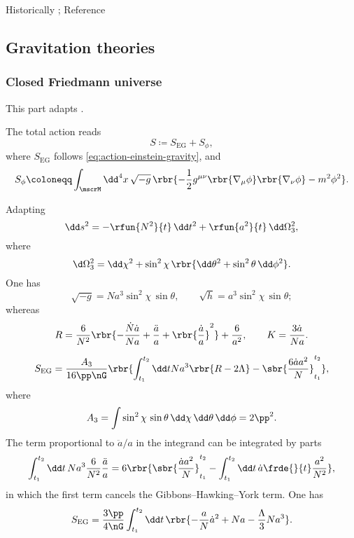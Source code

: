 \documentclass[a4paper,11pt]{article}
\begin{document}
Historically \cite{Brink1976,Deser1976,Polyakov1981};
Reference
\cite[sec.\ 3.2]{Kiefer2012}







\subsection{Gravitation theories}

\subsubsection*{Closed Friedmann universe}
This part adapts \cite[sec.\ 8.1.2]{Kiefer2012}.

The total action reads
\begin{equation}
S \coloneqq S_\text{EG} + S_\phi,
\end{equation}
where $S_\text{EG}$ follows \eqref{eq:action-einstein-gravity}, and
\begin{equation}
S_\phi \coloneqq \int_\mscrM\dd^4 x\, \sqrt{-g}\,
\rbr{-\frac{1}{2} g^{\mu\nu} \rbr{\nabla_\mu\phi} \rbr{\nabla_\nu\phi}
-m^2\phi^2}.
\end{equation}

Adapting
\begin{equation}
\dd s^2 = -\rfun{N^2}{t}\,\dd t^2 + \rfun{a^2}{t}\,\dd\Omega_3^2,
\end{equation}
where
\begin{equation}
\d\Omega_3^2 = \dd\chi^2+\sin^2\chi\,\rbr{\dd\theta^2+\sin^2\theta\,\dd\phi^2}.
\end{equation}
One has
\begin{equation}
\sqrt{-g} = N a^3 \sin^2\chi\,\sin\theta,\qquad
\sqrt{h} = a^3\sin^2\chi\,\sin\theta;
\end{equation}
whereas
\begin{equation}
R = \frac{6}{N^2}\rbr{-\frac{\dot{N}\dot{a}}{Na} + \frac{\ddot{a}}{a} + 
\rbr{\frac{\dot{a}}{a}}^2} + \frac{6}{a^2},\qquad
K = \frac{3\dot{a}}{Na}.
\end{equation}

\begin{equation}
S_\text{EG} = \frac{A_3}{16\pp\nG} \rbr{\int_{t_1}^{t_2} \dd t
Na^3\rbr{R - 2\Lambda} - \sbr{\frac{6\dot{a}a^2}{N}}_{t_1}^{t_2}},
\end{equation}
where
\begin{equation}
A_3 = \int \sin^2\chi\,\sin\theta\,\dd\chi\,\dd\theta\,\dd\phi = 2\pp^2.
\end{equation}
The term proportional to $\ddot{a}/a$ in the integrand can be integrated by
parts
\begin{equation}
\int_{t_1}^{t_2} \dd t\,Na^3 \frac{6}{N^2} \frac{\ddot{a}}{a}
= 6\rbr{\sbr{\frac{\dot{a}a^2}{N}}_{t_1}^{t_2} - \int_{t_1}^{t_2}\dd t
\,\dot{a}\frde{}{t}\frac{a^2}{N^2}},
\end{equation}
in which the first term cancels the Gibbons--Hawking--York term. One has
\begin{equation}
S_\text{EG} = \frac{3\pp}{4\nG}\int_{t_1}^{t_2} \dd t\,
\rbr{-\frac{a}{N}\dot{a}^2 + N a - \frac{\Lambda}{3}N a^3}.
\end{equation}
\end{document}
